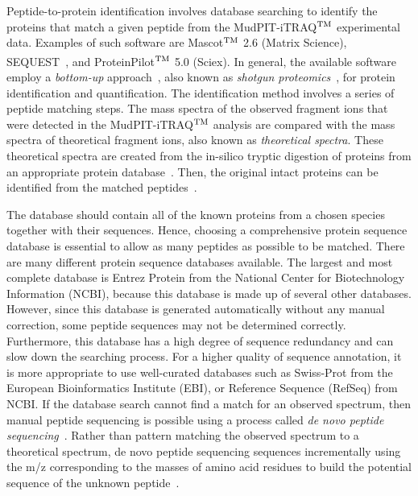 Peptide-to-protein identification involves database searching to identify the proteins that match a given peptide from the MudPIT-iTRAQ$^{\rm TM}$ experimental data. Examples of such software are Mascot$^{\rm TM}$ 2.6 (Matrix Science), SEQUEST\textsuperscript{\textregistered}~\citep{Sadygov2004}, and ProteinPilot$^{\rm TM}$ 5.0 (Sciex). In general, the available software employ a \emph{bottom-up} approach~\citep{Nunn2007}, also known as \emph{shotgun proteomics}~\citep{Nesvizhskii2005}, for protein identification and quantification. The identification method involves a series of peptide matching steps. The mass spectra of the observed fragment ions that were detected in the MudPIT-iTRAQ$^{\rm TM}$ analysis are compared with the mass spectra of theoretical fragment ions, also known as \emph{theoretical spectra}. These theoretical spectra are created from the in-silico tryptic digestion of proteins from an appropriate protein database~\citep{Sadygov2004}. Then, the original intact proteins can be identified from the matched peptides~\citep{Nesvizhskii2005}. 

The database should contain all of the known proteins from a chosen species together with their sequences. Hence, choosing a comprehensive protein sequence database is essential to allow as many peptides as possible to be matched. There are many different protein sequence databases available. The largest and most complete database is Entrez Protein from the National Center for Biotechnology Information (NCBI), because this database is made up of several other databases. However, since this database is generated automatically without any manual correction, some peptide sequences may not be determined correctly. Furthermore, this database has a high degree of sequence redundancy and can slow down the searching process. For a higher quality of sequence annotation, it is more appropriate to use well-curated databases such as Swiss-Prot from the European Bioinformatics Institute (EBI), or Reference Sequence (RefSeq) from NCBI. If the database search cannot find a match for an observed spectrum, then manual peptide sequencing is possible using a process called \emph{de novo peptide sequencing}~\citep{Colinge2007}. Rather than pattern matching the observed spectrum to a theoretical spectrum, de novo peptide sequencing sequences incrementally using the m/z corresponding to the masses of amino acid residues to build the potential sequence of the unknown peptide~\citep{Colinge2007}.

